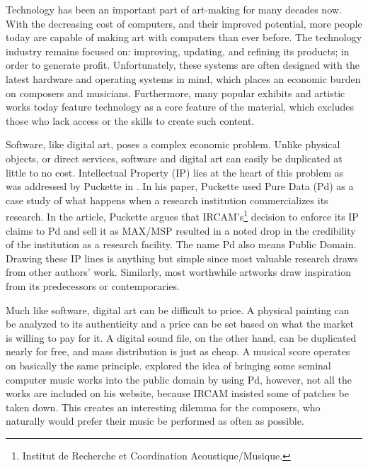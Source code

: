 
Technology has been an important part of art-making for many decades now. With the decreasing cost of computers, and their improved potential, more people today are capable of making art with computers than ever before. The technology industry remains focused on: improving, updating, and refining its products; in order to generate profit. Unfortunately, these systems are often designed with the latest hardware and operating systems in mind, which places an economic burden on composers and musicians. Furthermore, many popular exhibits and artistic works today feature technology as a core feature of the material, which excludes those who lack access or the skills to create such content.

Software, like digital art, poses a complex economic problem. Unlike physical objects, or direct services, software and digital art can easily be duplicated at little to no cost. Intellectual Property (IP) lies at the heart of this problem as was addressed by Puckette in \cite{puckette2004owns}. In his paper, Puckette used Pure Data (Pd) as a case study of what happens when a research institution commercializes its research. In the article, Puckette argues that IRCAM's\footnote{Institut de Recherche et Coordination Acoustique/Musique.} decision to enforce its IP claims to Pd and sell it as MAX/MSP resulted in a noted drop in the credibility of the institution as a research facility. The name Pd also means Public Domain. Drawing these IP lines is anything but simple since most valuable research draws from other authors' work. Similarly, most worthwhile artworks draw inspiration from its predecessors or contemporaries.

Much like software, digital art can be difficult to price. A physical painting can be analyzed to its authenticity and a price can be set based on what the market is willing to pay for it. A digital sound file, on the other hand, can be duplicated nearly for free, and mass distribution is just as cheap. A musical score operates on basically the same principle. \cite{puckette2001new} explored the idea of bringing some seminal computer music works into the public domain by using Pd, however, not all the works are included on his website, because IRCAM insisted some of patches be taken down. This creates an interesting dilemma for the composers, who naturally would prefer their music be performed as often as possible. 

